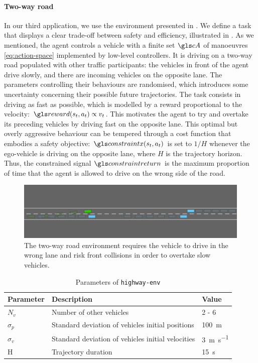 \paragraph{Two-way road}
In our third application, we use the \highwayenv environment presented in .
We define a task that displays a clear trade-off between safety and efficiency, illustrated in . As we mentioned, the agent controls a vehicle with a finite set $\cA$ of manoeuvres \eqref{eq:action-space} implemented by low-level controllers. It is driving on a two-way road populated with other traffic participants: the vehicles in front of the agent drive slowly, and there are incoming vehicles on the opposite lane. The parameters controlling their behaviours are randomised, which introduces some uncertainty concerning their possible future trajectories.
The task consists in driving as fast as possible, which is modelled by a reward proportional to the velocity: $\R(s_t, a_t) \propto v_t$. This motivates the agent to try and overtake its preceding vehicles by driving fast on the opposite lane. This optimal but overly aggressive behaviour can be tempered through a cost function that embodies a safety objective: $\constraint(s_t, a_t)$ is set to $1/H$ whenever the ego-vehicle is driving on the opposite lane, where $H$ is the trajectory horizon. Thus, the constrained signal $\constraintreturn$ is the maximum proportion of time that the agent is allowed to drive on the wrong side of the road.

\begin{figure}[t]
	\centering
	\includegraphics[width=\linewidth]{img/two-way}
	\caption{The two-way road environment requires the vehicle to drive in the wrong lane and risk front collisions in order to overtake slow vehicles.}
	\label{fig:two-way}
\end{figure}

\begin{table}[ht!]
    \centering
    \begin{tabular}{lll}
        \toprule
        Parameter & Description & Value\tabularnewline
        \midrule
        $N_v$& Number of other vehicles & 2 - 6\tabularnewline
        $\sigma_p$& Standard deviation of vehicles initial positions & \SI{100}{\meter}\tabularnewline
        $\sigma_v$& Standard deviation of vehicles initial velocities & \SI{3}{\meter\per\second}\tabularnewline
        H & Trajectory duration & \SI{15}{\second}\tabularnewline
        \bottomrule
    \end{tabular}

    \caption{Parameters of \texttt{highway-env}}
    \label{tab:param-highway-env}
\end{table}

